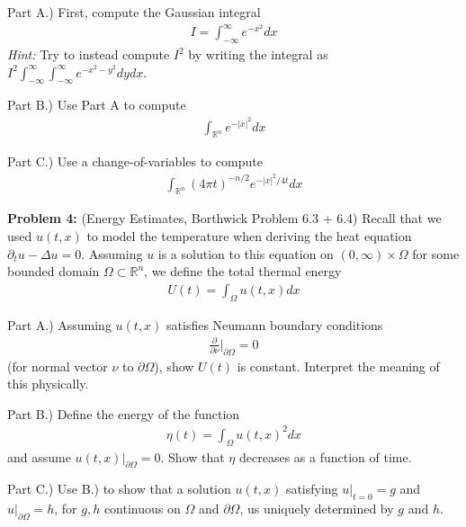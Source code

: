 \documentclass{article}
\newcommand{\R}{{\mathbb{R}}}
\newcommand{\pd}{\partial}
\begin{document}
	Part A.) First, compute the Gaussian integral
	\begin{align*}
		I = \int_{-\infty}^{\infty} e^{-x^{2}} dx
	\end{align*} 
	\textit{Hint:} Try to instead compute $I^{2}$ by writing the integral as $I^2 \int_{-\infty}^{\infty}  \int_{-\infty}^{\infty} e^{-x^{2}-y^{2}} dy dx$. 
	
	Part B.) Use Part A to compute 
	\begin{align*}
		\int_{\R^{n}} e^{-|x|^{2}} dx
	\end{align*}
	
	Part C.) Use a change-of-variables to compute 
	\begin{align*}
		\int_{\R^{n}} (4\pi t)^{-n/2}e^{-|x|^{2}/4t} dx
	\end{align*}
	
	
	
	
	
	
	\textbf{Problem 4:} (Energy Estimates, Borthwick Problem 6.3 + 6.4) Recall that we used $u(t,x)$ to model the temperature when deriving the heat equation $\pd_{t}u - \Delta u = 0$. Assuming $u$ is a solution to this equation on $(0,\infty) \times \Omega$ for some bounded domain $\Omega \subset \R^{n}$, we define the total thermal energy 
	\begin{align*}
		U(t) = \int_{\Omega} u(t,x) dx
	\end{align*}
	
	Part A.) Assuming $u(t,x)$ satisfies Neumann boundary conditions 
	\begin{align*}
		\frac{\pd}{\pd \nu} |_{\pd \Omega} = 0
	\end{align*}
	(for normal vector $\nu$ to $\pd \Omega$), show $U(t)$ is constant. Interpret the meaning of this physically. 
	
	Part B.) Define the energy of the function
	\begin{align*}
		\eta(t) = \int_{\Omega} u(t,x)^{2} dx
	\end{align*}
	and assume $u(t,x) |_{\pd \Omega} = 0$. Show that $\eta$ decreases as a function of time. 
	
	Part C.) Use B.) to show that a solution $u(t,x)$ satisfying $u|_{t=0} = g$ and $u|_{\pd \Omega} = h$, for $g,h$ continuous on $\Omega$ and $\pd \Omega$, us uniquely determined by $g$ and $h$.
	
	
\end{document}
